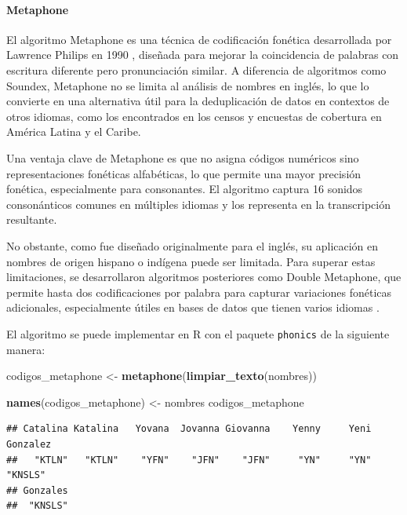 \documentclass[
  12pt,
]{book}
\newenvironment{Shaded}{\begin{snugshade}}{\end{snugshade}}
\newcommand{\FunctionTok}[1]{\textcolor[rgb]{0.13,0.29,0.53}{\textbf{#1}}}
\newcommand{\NormalTok}[1]{#1}
\newcommand{\OtherTok}[1]{\textcolor[rgb]{0.56,0.35,0.01}{#1}}
\begin{document}
\paragraph{Metaphone}\label{metaphone}

El algoritmo Metaphone es una técnica de codificación fonética desarrollada por Lawrence Philips en 1990 \citep{philips1990hanging}, diseñada para mejorar la coincidencia de palabras con escritura diferente pero pronunciación similar. A diferencia de algoritmos como Soundex, Metaphone no se limita al análisis de nombres en inglés, lo que lo convierte en una alternativa útil para la deduplicación de datos en contextos de otros idiomas, como los encontrados en los censos y encuestas de cobertura en América Latina y el Caribe.

Una ventaja clave de Metaphone es que no asigna códigos numéricos sino representaciones fonéticas alfabéticas, lo que permite una mayor precisión fonética, especialmente para consonantes. El algoritmo captura 16 sonidos consonánticos comunes en múltiples idiomas y los representa en la transcripción resultante.

No obstante, como fue diseñado originalmente para el inglés, su aplicación en nombres de origen hispano o indígena puede ser limitada. Para superar estas limitaciones, se desarrollaron algoritmos posteriores como Double Metaphone, que permite hasta dos codificaciones por palabra para capturar variaciones fonéticas adicionales, especialmente útiles en bases de datos que tienen varios idiomas \citep{christen2012data}.

El algoritmo se puede implementar en R con el paquete \texttt{phonics} de la siguiente manera:

\begin{Shaded}
\begin{Highlighting}[]
\NormalTok{codigos\_metaphone }\OtherTok{\textless{}{-}} \FunctionTok{metaphone}\NormalTok{(}\FunctionTok{limpiar\_texto}\NormalTok{(nombres))}

\FunctionTok{names}\NormalTok{(codigos\_metaphone) }\OtherTok{\textless{}{-}}\NormalTok{ nombres}
\NormalTok{codigos\_metaphone}
\end{Highlighting}
\end{Shaded}

\begin{verbatim}
## Catalina Katalina   Yovana  Jovanna Giovanna    Yenny     Yeni Gonzalez 
##   "KTLN"   "KTLN"    "YFN"    "JFN"    "JFN"     "YN"     "YN"  "KNSLS" 
## Gonzales 
##  "KNSLS"
\end{verbatim}
\end{document}
